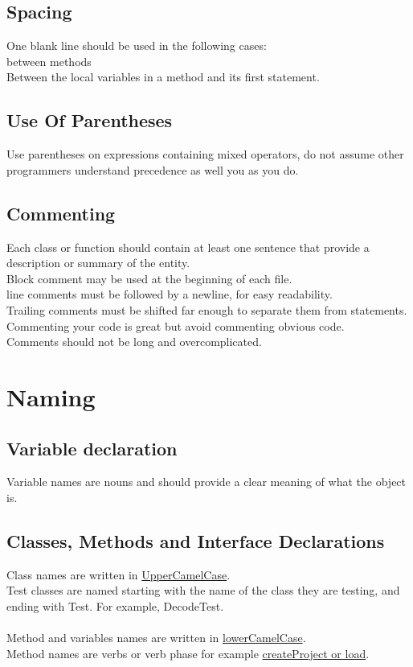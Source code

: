 \documentclass[a4paper,12pt]{report}
\begin{document}
\subsection{Spacing}
One blank line should be used in the following cases:\\
\textbullet between methods\\
\textbullet Between the local variables in a method and its first statement.

\subsection{Use Of Parentheses}
Use parentheses on expressions containing mixed operators, do not assume other programmers understand precedence as well you as you do.
\subsection{Commenting}
Each class or function should contain at least one sentence that provide a description or summary of the entity.\\
Block comment may be used at the beginning of each file.\\
line comments must be followed by a newline, for easy readability.\\
Trailing comments must be shifted far enough to separate them from statements.\\
Commenting your code is great but avoid commenting obvious code.\\
Comments should not be long and overcomplicated. 

\section{Naming}
\subsection{Variable declaration}
Variable names are nouns and should provide a clear meaning of what the object is.
\subsection{Classes, Methods and Interface Declarations}
Class names are written in \underline{UpperCamelCase}.\\
Test classes are named starting with the name of the class they are testing, and ending with Test. For example, DecodeTest.\\\\
Method and variables names are written in \underline{lowerCamelCase}.\\
Method names are verbs or verb phase for example \underline{createProject or load}.
\end{document}
